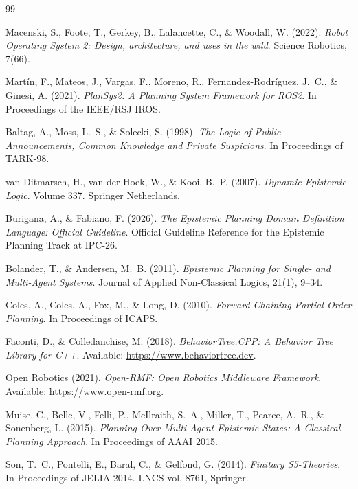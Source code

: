 \documentclass[12pt,a4paper]{article}
\theoremstyle{definition}
\theoremstyle{plain}
\begin{document}
\newpage

\begin{thebibliography}{99}

Macenski, S., Foote, T., Gerkey, B., Lalancette, C., \& Woodall, W. (2022).
\textit{Robot Operating System 2: Design, architecture, and uses in the wild}.
Science Robotics, 7(66).

Mart\'in, F., Mateos, J., Vargas, F., Moreno, R., Fernandez-Rodr\'iguez, J.~C., \& Ginesi, A.
(2021). \textit{PlanSys2: A Planning System Framework for ROS2}.
In Proceedings of the IEEE/RSJ IROS.

Baltag, A., Moss, L.~S., \& Solecki, S. (1998).
\textit{The Logic of Public Announcements, Common Knowledge and Private Suspicions}.
In Proceedings of TARK-98.

van Ditmarsch, H., van der Hoek, W., \& Kooi, B.~P. (2007).
\textit{Dynamic Epistemic Logic}. Volume 337. Springer Netherlands.

Burigana, A., \& Fabiano, F. (2026).
\textit{The Epistemic Planning Domain Definition Language: Official Guideline}.
Official Guideline Reference for the Epistemic Planning Track at IPC-26.

Bolander, T., \& Andersen, M.~B. (2011).
\textit{Epistemic Planning for Single- and Multi-Agent Systems}.
Journal of Applied Non-Classical Logics, 21(1), 9--34.

Coles, A., Coles, A., Fox, M., \& Long, D. (2010).
\textit{Forward-Chaining Partial-Order Planning}.
In Proceedings of ICAPS.

Faconti, D., \& Colledanchise, M. (2018).
\textit{BehaviorTree.CPP: A Behavior Tree Library for C++}.
Available: \url{https://www.behaviortree.dev}.

Open Robotics (2021).
\textit{Open-RMF: Open Robotics Middleware Framework}.
Available: \url{https://www.open-rmf.org}.

Muise, C., Belle, V., Felli, P., McIlraith, S.~A., Miller, T., Pearce, A.~R., \&
Sonenberg, L. (2015).
\textit{Planning Over Multi-Agent Epistemic States: A Classical Planning Approach}.
In Proceedings of AAAI 2015.

Son, T.~C., Pontelli, E., Baral, C., \& Gelfond, G. (2014).
\textit{Finitary S5-Theories}.
In Proceedings of JELIA 2014. LNCS vol. 8761, Springer.


\end{thebibliography}
\end{document}
